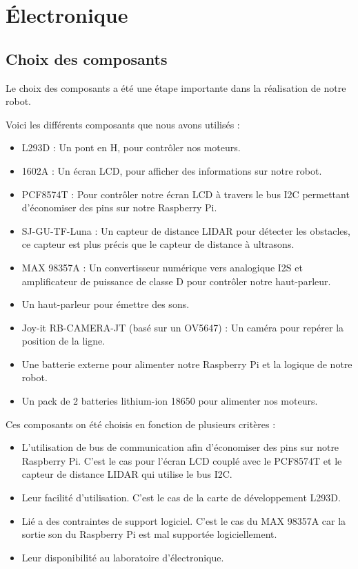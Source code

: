 \section{Électronique}

\subsection{Choix des composants}

Le choix des composants a été une étape importante dans la réalisation de notre robot.

Voici les différents composants que nous avons utilisés :
\begin{itemize}
    \item L293D : Un pont en H, pour contrôler nos moteurs.
    \item 1602A : Un écran LCD, pour afficher des informations sur notre robot.
    \item PCF8574T : Pour contrôler notre écran LCD à travers le bus I2C permettant d'économiser des pins sur notre Raspberry Pi.
    \item SJ-GU-TF-Luna : Un capteur de distance LIDAR pour détecter les obstacles, ce capteur est plus précis que le capteur de distance à ultrasons.
    \item MAX 98357A : Un convertisseur numérique vers analogique I2S et amplificateur de puissance de classe D pour contrôler notre haut-parleur.
    \item Un haut-parleur pour émettre des sons.
    \item Joy-it RB-CAMERA-JT (basé sur un OV5647) : Un caméra pour repérer la position de la ligne.
    \item Une batterie externe pour alimenter notre Raspberry Pi et la logique de notre robot.
    \item Un pack de 2 batteries lithium-ion 18650 pour alimenter nos moteurs.
\end{itemize}

Ces composants on été choisis en fonction de plusieurs critères :
\begin{itemize}
    \item L'utilisation de bus de communication afin d'économiser des pins sur notre Raspberry Pi. C'est le cas pour l'écran LCD couplé avec le PCF8574T et le capteur de distance LIDAR qui utilise le bus I2C.
    \item Leur facilité d'utilisation. C'est le cas de la carte de développement L293D.
    \item Lié a des contraintes de support logiciel. C'est le cas du MAX 98357A car la sortie son du Raspberry Pi est mal supportée logiciellement.
    \item Leur disponibilité au laboratoire d'électronique.
\end{itemize}

